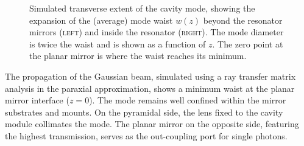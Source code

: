 \documentclass[../Thesis-IJspeert.tex]{subfiles}
\begin{document}
\begin{figure}[t!]
	\caption[Simulated transverse extent of the cavity mode]{Simulated transverse extent of the cavity mode, showing the expansion of the (average) mode waist $w(z)$ beyond the resonator mirrors \textsc{(left)} and inside the resonator \textsc{(right)}. The mode diameter is twice the waist and is shown as a function of $z$. The zero point at the planar mirror is where the waist reaches its minimum.}
	\label{modeexpansion} 
\end{figure}
The propagation of the Gaussian beam, simulated using a ray transfer matrix analysis in the paraxial approximation, shows a minimum waist at the planar mirror interface ($z=0$). The mode remains well confined within the mirror substrates and mounts. On the pyramidal side, the lens fixed to the cavity module collimates the mode. The planar mirror on the opposite side, featuring the highest transmission, serves as the out-coupling port for single photons.
\end{document}
